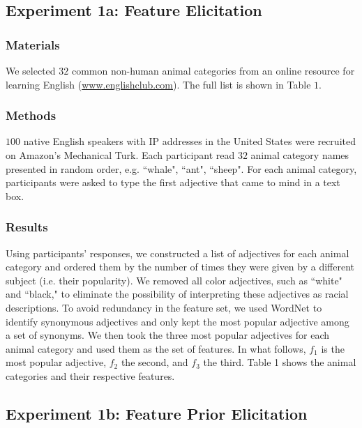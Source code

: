 \documentclass[10pt,letterpaper]{article}
\begin{document}
\subsection{Experiment 1a: Feature Elicitation}
\subsubsection{Materials}
We selected $32$ common non-human animal categories from an online resource for learning English (\url{www.englishclub.com}). The full list is shown in Table $1$.
\subsubsection{Methods}
$100$ native English speakers with IP addresses in the United States were recruited on Amazon's Mechanical Turk. Each participant read $32$ animal category names presented in random order, e.g. ``whale", ``ant", ``sheep". For each animal category, participants were asked to type the first adjective that came to mind in a text box. 
\subsubsection{Results}
Using participants' responses, we constructed a list of adjectives for each animal category and ordered them by the number of times they were given by a different subject (i.e. their popularity). We removed all color adjectives, such as ``white" and ``black," to eliminate the possibility of interpreting these adjectives as racial descriptions. To avoid redundancy in the feature set, we used WordNet \cite{Miller95wordnet:a} to identify synonymous adjectives and only kept the most popular adjective among a set of synonyms. We then took the three most popular adjectives for each animal category and used them as the set of features. In what follows, $f_1$ is the most popular adjective, $f_2$ the second, and $f_3$ the third. Table 1 shows the animal categories and their respective features.

\subsection{Experiment 1b: Feature Prior Elicitation}
\end{document}

